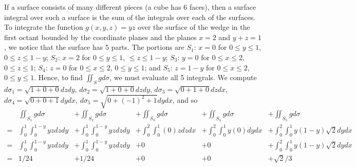 \begin{example}
If a surface consists of many different pieces (a cube has 6 faces),
then a surface integral over such a surface is the sum of the
integrals over each of the surfaces. To integrate the function
$g(x,y,z)=yz$ over the surface of the wedge in the first octant
bounded by the coordinate planes and the planes $x=2$ and $y+z=1$, we
notice that the surface has 5 parts.  The portions are $S_1$: $x=0$ for
$0\leq y\leq 1$, $0\leq z\leq 1-y$;  $S_2$: $x=2$ for $0\leq y\leq 1$, $\leq z\leq 1-y$;
$S_3$: $y=0$ for $0\leq x\leq 2$, $0\leq z\leq 1$; $S_4$: $z=0$ for $0\leq x\leq 2$, $0\leq y\leq 1$; and
$S_5$: $z=1-y$ for $0\leq x\leq 2$, $0\leq y\leq 1$. Hence, to find $\iint_S g d\sigma$, we
must evaluate all 5 integrals.  We compute $d\sigma_1 = \sqrt{1+0+0}dzdy$,
$d\sigma_2=\sqrt{1+0+0}dzdy$, $d\sigma_3=\sqrt{0+1+0}dzdx$, $d\sigma_4=\sqrt{0+0+1}dydx$, $d\sigma_5=\sqrt{0+(-1)^2+1}dydx$, and so 
$$\begin{array}{llllll}
&\iint_{S_1} g d\sigma&+\iint_{S_2} g d\sigma&+\iint_{S_3} g d\sigma&+\iint_{S_4} g
d\sigma&+\iint_{S_5} g d\sigma\\
=&\int_0^1\int_{0}^{1-y} yz dzdy&+\int_0^1\int_{0}^{1-y} yz dzdy&+\int_0^2\int_{0}^{1}
(0)z dzdx&+\int_0^2\int_{0}^{1} y(0) dydx&+\int_0^2\int_{0}^{1} y(1-y)
\sqrt{2}dydx\\
=&\int_0^1\int_{0}^{1-y} yz dzdy&+\int_0^1\int_{0}^{1-y} yz
dzdy&+0&+0&+\int_0^2\int_{0}^{1} y(1-y) \sqrt{2}dydx\\
=&1/24&+1/24&+0&+0&+\sqrt{2}/3
\end{array}$$
\end{example}




